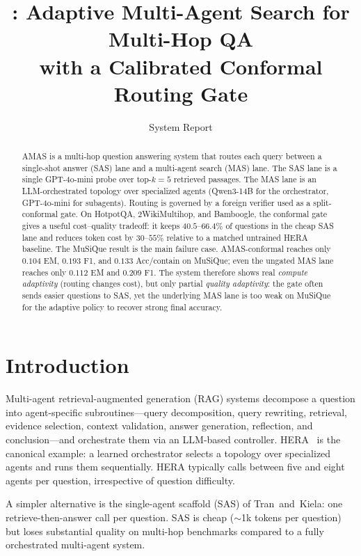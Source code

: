 \documentclass[11pt]{article}
\title{\textbf{\amas: Adaptive Multi-Agent Search for Multi-Hop QA\\
with a Calibrated Conformal Routing Gate}}
\author{System Report}
\date{}
\newcommand{\amas}{AMAS\xspace}
\newcommand{\hera}{HERA\xspace}
\newcommand{\sas}{SAS\xspace}
\newcommand{\mas}{MAS\xspace}
\begin{document}
\maketitle

\begin{abstract}
\amas is a multi-hop question answering system that routes each query between
a single-shot answer (\sas) lane and a multi-agent search (\mas) lane. The
\sas lane is a single GPT-4o-mini probe over top-$k=5$ retrieved passages. The
\mas lane is an LLM-orchestrated topology over specialized agents (Qwen3-14B
for the orchestrator, GPT-4o-mini for subagents). Routing is governed by a
foreign verifier used as a split-conformal gate. On HotpotQA, 2WikiMultihop,
and Bamboogle, the conformal gate gives a useful cost--quality tradeoff: it
keeps $40.5$--$66.4\%$ of questions in the cheap \sas lane and reduces token
cost by $30$--$55\%$ relative to a matched untrained \hera baseline. The
MuSiQue result is the main failure case. \amas-conformal reaches only
$0.104$ EM, $0.193$ F1, and $0.133$ Acc/contain on MuSiQue; even the ungated
\mas lane reaches only $0.112$ EM and $0.209$ F1. The system therefore shows
real \emph{compute adaptivity} (routing changes cost), but only partial
\emph{quality adaptivity}: the gate often sends easier questions to \sas, yet
the underlying \mas lane is too weak on MuSiQue for the adaptive policy to
recover strong final accuracy.
\end{abstract}

\section{Introduction}

Multi-agent retrieval-augmented generation (RAG) systems decompose a question
into agent-specific subroutines---query decomposition, query rewriting,
retrieval, evidence selection, context validation, answer generation,
reflection, and conclusion---and orchestrate them via an LLM-based controller.
\hera~\cite{hera-paper} is the canonical example: a learned orchestrator
selects a topology over specialized agents and runs them sequentially. \hera
typically calls between five and eight agents per question, irrespective of
question difficulty.

A simpler alternative is the single-agent scaffold (\sas) of
Tran~and~Kiela: one retrieve-then-answer call per question. \sas is cheap
($\sim$1k tokens per question) but loses substantial quality on multi-hop
benchmarks compared to a fully orchestrated multi-agent system.
\end{document}
